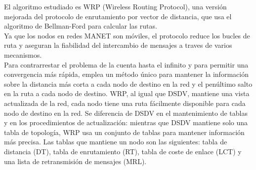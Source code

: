\documentclass{article}
\begin{document}
                                                                                                                                                                                                                                                                                                                                                                                                                                                                                                                                                                                                                                                  El algoritmo estudiado es WRP (Wireless Routing Protocol), una versión mejorada del protocolo de enrutamiento por vector de distancia, que usa el algoritmo de Bellman-Ford para calcular las rutas.
                                                                                                                                                                                                                                                                                                                                                                                                                                                                                                                                                                                                                                                  \\                                                                                                                                                                                                                                                                                                                                                                                                                                                                                                                                                                                                                                        	Ya que los nodos en redes MANET son móviles, el protocolo reduce los bucles de ruta y aseguran la fiabilidad del intercambio de mensajes a traves de varios mecanismos.
\\
	Para contrarrestar el problema de la cuenta hasta el infinito y para permitir una convergencia más rápida, emplea un método único para mantener la información sobre la distancia más corta a cada nodo de destino en la red y el penúltimo salto en la ruta a cada nodo de destino. WRP, al igual que DSDV, mantiene una vista actualizada de la red, cada nodo tiene una ruta fácilmente disponible para cada nodo de destino en la red. Se diferencia de DSDV en el mantenimiento de tablas y en los procedimientos de actualización: mientras que DSDV mantiene solo una tabla de topología, WRP usa un conjunto de tablas para mantener información más precisa. Las tablas que mantiene un nodo son las siguientes: tabla de distancia (DT), tabla de enrutamiento (RT), tabla de coste de enlace (LCT) y una lista de retransmisión de mensajes (MRL).
\end{document}

